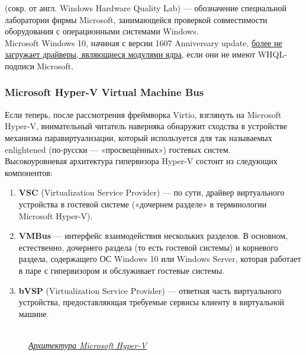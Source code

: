 \documentclass[14pt, a4paper]{article}
\begin{document}
\href{https://ru.wikipedia.org/wiki/WHQL}{} (сокр. от англ. Windows Hardware Quality Lab) — обозначение специальной лаборатории
фирмы Microsoft, занимающейся проверкой совместимости оборудования с операционными
системами Windows.\\

Microsoft Windows 10, начиная с версии 1607 Anniversary update, \href{https://techcommunity.microsoft.com/t5/Windows-Hardware-Certification/Driver-Signing-changes-in-Windows-10-version-1607/ba-p/364894}{более не загружает драйверы,
являющиеся модулями ядра}, если они не имеют WHQL-подписи Microsoft.

\subsubsection*{Microsoft Hyper-V Virtual Machine Bus} 

Если теперь, после рассмотрения фреймворка Virtio, взглянуть на Microsoft Hyper-V, внимательный
читатель наверняка обнаружит сходства в устройстве механизма паравиртуализации, который
используется для так называемых enlightened (по-русски — «просвещённых») гостевых систем.\\

Высокоуровневая архитектура гипервизора Hyper-V состоит из следующих компонентов:

\begin{enumerate}
    \item \textbf{VSC} (Virtualization Service Provider) — по сути, драйвер виртуального устройства в гостевой
    системе («дочернем разделе» в терминологии Microsoft Hyper-V).
    \item \textbf{VMBus} — интерфейс взаимодействия нескольких разделов. В основном, естественно,
    дочернего раздела (то есть гостевой системы) и корневого раздела, содержащего ОС Windows
    10 или Windows Server, которая работает в паре с гипервизором и обслуживает гостевые
    системы.
    \item \textbf{bVSP} (Virtualization Service Provider) — ответная часть виртуального устройства,
    предоставляющая требуемые сервисы клиенту в виртуальной машине.
\end{enumerate}

\begin{figure}[h]
    \centering
    \\ 
    \href{https://docs.microsoft.com/ru-ru/virtualization/hyper-v-on-windows/reference/hyper-v-architecture}{\small\textit{Архитектура Microsoft Hyper-V}} 
    \label{framework} 
\end{figure}
\end{document}
